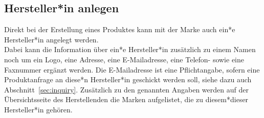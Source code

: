 \subsection{Hersteller*in anlegen}
\label{sec:concept:manufacturer}

Direkt bei der Erstellung eines Produktes kann mit der Marke auch
ein*e Hersteller*in angelegt werden.\\
Dabei kann die Information über ein*e Hersteller*in zusätzlich zu
einem Namen noch um ein Logo, eine
Adresse, eine E-Mailadresse, eine Telefon- sowie eine Faxnummer ergänzt werden.
Die E-Mailadresse ist eine Pflichtangabe, sofern eine Produktanfrage
an diese*n Hersteller*in geschickt werden soll, siehe dazu auch
Abschnitt~\ref{sec:inquiry}.
Zusätzlich zu den genannten Angaben werden auf der Übersichtsseite des 
Herstellenden die Marken aufgelistet, die
zu diesem*dieser Hersteller*in gehören.